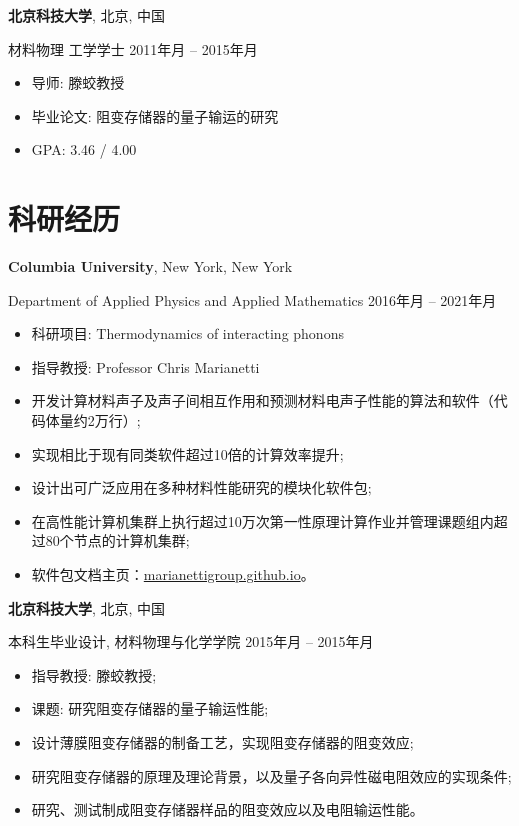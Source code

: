 \documentclass[
  a4paper,
  12pt
]{cv}
\renewcommand{\DatestampYMD}[3]{\mbox{#1年\number#2月}}
\begin{document}
{\textbf{北京科技大学}},
北京, 中国

{材料物理} 工学学士
\hfill
\DatestampYMD{2011}{09}{01} --
\DatestampYMD{2015}{06}{26}
\begin{itemize}
\item 导师: 滕蛟教授
\item 毕业论文: 阻变存储器的量子输运的研究
\item GPA: 3.46 / 4.00
\end{itemize}


\section{科研经历}

{\textbf{Columbia University}},
New York, New York

Department of Applied Physics and Applied Mathematics
\hfill
\DatestampYMD{2016}{05}{17} --
\DatestampYMD{2021}{10}{20}
\begin{itemize}
\item 科研项目: Thermodynamics of interacting phonons
\item 指导教授: Professor Chris Marianetti
\item 开发计算材料声子及声子间相互作用和预测材料电声子性能的算法和软件（代码体量约2万行）;
\item 实现相比于现有同类软件超过10倍的计算效率提升;
\item 设计出可广泛应用在多种材料性能研究的模块化软件包;
\item 在高性能计算机集群上执行超过10万次第一性原理计算作业并管理课题组内超过80个节点的计算机集群;
\item 软件包文档主页：\href{https://marianettigroup.github.io}{marianettigroup.github.io}。
\end{itemize}

{\textbf{北京科技大学}},
北京, 中国

本科生毕业设计, 
材料物理与化学学院
\hfill
\DatestampYMD{2015}{02}{01} --
\DatestampYMD{2015}{06}{25}
\begin{itemize}
\item 指导教授: 滕蛟教授;
\item 课题: 研究阻变存储器的量子输运性能; 
\item 设计薄膜阻变存储器的制备工艺，实现阻变存储器的阻变效应; 
\item 研究阻变存储器的原理及理论背景，以及量子各向异性磁电阻效应的实现条件; 
\item 研究、测试制成阻变存储器样品的阻变效应以及电阻输运性能。
\end{itemize}
\end{document}
